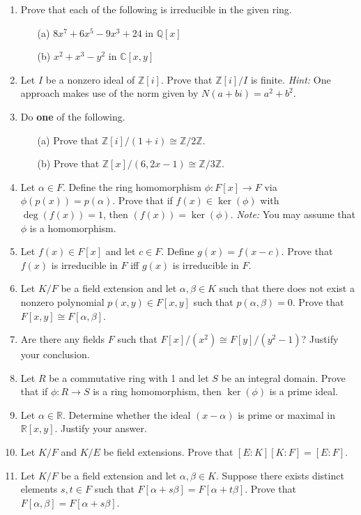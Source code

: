 \documentclass[11pt]{scrartcl}
\theoremstyle{definition}
\begin{document}
\begin{enumerate}

\item Prove that each of the following is irreducible in the given ring.
\begin{enumerate}
\item[(a)] $8x^7+6x^5-9x^3+24$ in $\mathbb{Q}[x]$
\item[(b)] $x^2+x^3-y^2$ in $\mathbb{C}[x,y]$
\end{enumerate}

\item Let $I$ be a nonzero ideal of $\mathbb{Z}[i]$.  Prove that $\mathbb{Z}[i]/I$ is finite. \emph{Hint:} One approach makes use of the norm given by $N(a+bi)=a^2+b^2$. 

\item Do \textbf{one} of the following.
\begin{enumerate}
\item[(a)] Prove that $\mathbb{Z}[i]/(1+i)\cong \mathbb{Z}/2\mathbb{Z}$.
\item[(b)] Prove that $\mathbb{Z}[x]/(6,2x-1)\cong \mathbb{Z}/3\mathbb{Z}$.
\end{enumerate}

\item Let $\alpha\in F$.  Define the ring homomorphism $\phi:F[x]\to F$ via $\phi(p(x))=p(\alpha)$.  Prove that if $f(x)\in\ker(\phi)$ with $\deg(f(x))=1$, then $(f(x))=\ker(\phi)$. \emph{Note:} You may assume that $\phi$ is a homomorphism.

\item Let $f(x)\in F[x]$ and let $c\in F$. Define $g(x)=f(x-c)$. Prove that $f(x)$ is irreducible in $F$ iff $g(x)$ is irreducible in $F$.

\item Let $K/F$ be a field extension and let $\alpha,\beta\in K$ such that there does not exist a nonzero polynomial $p(x,y)\in F[x,y]$ such that $p(\alpha,\beta)=0$.  Prove that $F[x,y]\cong F[\alpha,\beta]$.

\item Are there any fields $F$ such that $F[x]/(x^2)\cong F[y]/(y^2-1)$?  Justify your conclusion.

\item Let $R$ be a commutative ring with 1 and let $S$ be an integral domain.  Prove that if $\phi:R\to S$ is a ring homomorphism, then $\ker(\phi)$ is a prime ideal.

\item Let $\alpha\in \mathbb{R}$. Determine whether the ideal $(x-\alpha)$ is prime or maximal in $\mathbb{R}[x,y]$.  Justify your answer.

\item Let $K/F$ and $K/E$ be field extensions. Prove that $[E:K][K:F]=[E:F]$.

\item Let $K/F$ be a field extension and let $\alpha,\beta\in K$.  Suppose there exists distinct elements $s,t\in F$ such that $F[\alpha+s\beta]=F[\alpha+t\beta]$. Prove that $F[\alpha,\beta]=F[\alpha+s\beta]$.

\end{enumerate}
\end{document}
